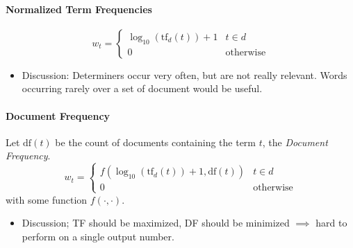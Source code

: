 \documentclass[a4paper, 11pt, accentcolor = tud3b]{tudreport}
\begin{document}
                \paragraph{Normalized Term Frequencies} %
                    \begin{equation*}
	                    w_t =
	                    	\begin{cases}
		                    	\log_{10}(\text{tf}_d(t)) + 1 & t \in d \\
		                    	0 & \text{otherwise}
	                    	\end{cases}
                    \end{equation*}
                    
                    \begin{itemize}
                    	\item Discussion: Determiners occur very often, but are not really relevant. Words occurring rarely over a set of document would be useful.
                    \end{itemize}

                \paragraph{Document Frequency} %
                	Let \( \text{df}(t) \) be the count of documents containing the term \(t\), the \textit{Document Frequency}.
                    \begin{equation*}
	                    w_t =
	                    	\begin{cases}
		                    	f(\log_{10}(\text{tf}_d(t)) + 1, \text{df}(t)) & t \in d \\
		                    	0 & \text{otherwise}
	                    	\end{cases}
                    \end{equation*}
                    with some function \( f(\cdot, \cdot) \).
                    
                    \begin{itemize}
                    	\item Discussion; TF should be maximized, DF should be minimized \(\implies\) hard to perform on a single output number.
                    \end{itemize}
\end{document}
